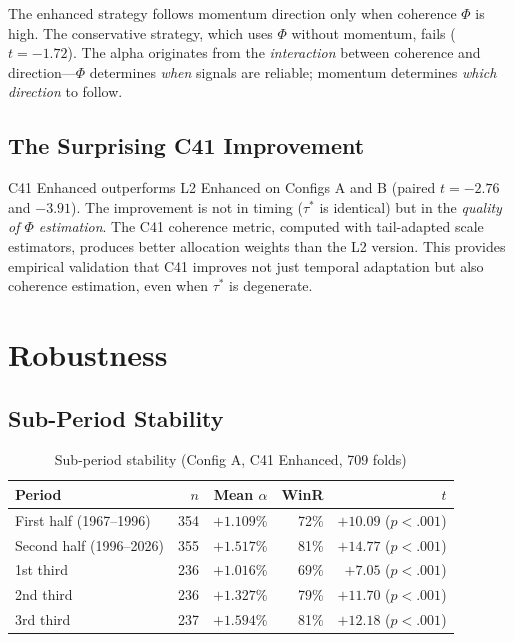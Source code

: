 \documentclass[11pt,a4paper]{article}
\begin{document}
The enhanced strategy follows momentum direction only when coherence $\Phi$ is high. The conservative strategy, which uses $\Phi$ without momentum, fails ($t = -1.72$). The alpha originates from the \emph{interaction} between coherence and direction---$\Phi$ determines \emph{when} signals are reliable; momentum determines \emph{which direction} to follow.

\subsection{The Surprising C41 Improvement}

C41 Enhanced outperforms L2 Enhanced on Configs A and B (paired $t = -2.76$ and $-3.91$). The improvement is not in timing ($\tau^*$ is identical) but in the \emph{quality of $\Phi$ estimation}. The C41 coherence metric, computed with tail-adapted scale estimators, produces better allocation weights than the L2 version. This provides empirical validation that C41 improves not just temporal adaptation but also coherence estimation, even when $\tau^*$ is degenerate.

\section{Robustness}

\subsection{Sub-Period Stability}

\begin{table}[H]
\centering
\caption{Sub-period stability (Config A, C41 Enhanced, 709 folds)}
\label{tab:robustness}
\begin{tabular}{lrrrr}
\toprule
Period & $n$ & Mean $\alpha$ & WinR & $t$ \\
\midrule
First half (1967--1996) & 354 & $+1.109\%$ & 72\% & $+10.09$ ($p<.001$) \\
Second half (1996--2026) & 355 & $+1.517\%$ & 81\% & $+14.77$ ($p<.001$) \\
\midrule
1st third & 236 & $+1.016\%$ & 69\% & $+7.05$ ($p<.001$) \\
2nd third & 236 & $+1.327\%$ & 79\% & $+11.70$ ($p<.001$) \\
3rd third & 237 & $+1.594\%$ & 81\% & $+12.18$ ($p<.001$) \\
\bottomrule
\end{tabular}
\end{table}
\end{document}
